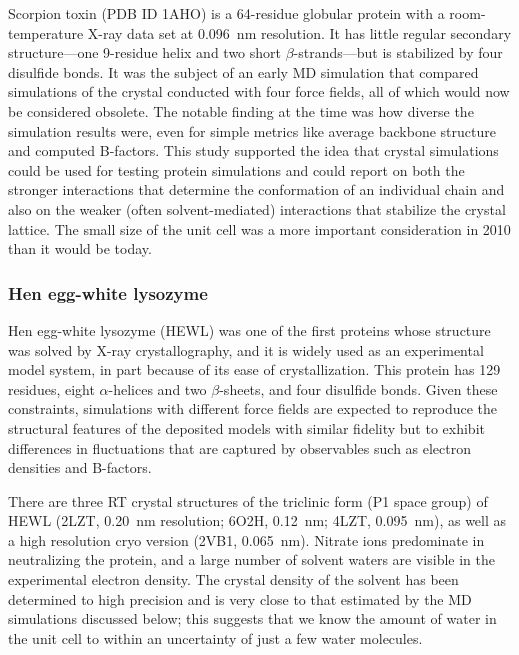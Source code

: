 \documentclass[9pt,review]{livecoms}
\begin{document}
Scorpion toxin (PDB ID 1AHO) is a 64-residue globular protein with a room-temperature X-ray data set at \qty{0.096}{\nano\meter} resolution.
It has little regular secondary structure---one 9-residue helix and two short $\beta$-strands---but is stabilized by four disulfide bonds.
It was the subject of an early MD simulation\cite{cerutti_simulations_2010} that compared simulations of the crystal conducted with four force fields, all of which would now be considered obsolete.
The notable finding at the time was how diverse the simulation results were, even for simple metrics like average backbone structure and computed B-factors.
This study supported the idea that crystal simulations could be used for testing protein simulations and could report on both the stronger interactions that determine the conformation of an individual chain and also on the weaker (often solvent-mediated) interactions that stabilize the crystal lattice.
The small size of the unit cell was a more important consideration in 2010 than it would be today.

\subsubsection{Hen egg-white lysozyme}
\label{sub2:hewl}

Hen egg-white lysozyme (HEWL) was one of the first proteins whose structure was solved by X-ray crystallography, and it is widely used as an experimental model system, in part because of its ease of crystallization.
This protein has 129 residues, eight $\alpha$-helices and two $\beta$-sheets, and four disulfide bonds.
Given these constraints, simulations with different force fields are expected to reproduce the structural features of the deposited models with similar fidelity but to exhibit differences in fluctuations that are captured by observables such as electron densities and B-factors.

There are three RT crystal structures of the triclinic form (P1 space group) of HEWL (2LZT, \qty{0.20}{\nano\meter} resolution; 6O2H, \qty{0.12}{\nano\meter}; 4LZT, \qty{0.095}{\nano\meter}), as well as a high resolution cryo version (2VB1, \qty{0.065}{\nano\meter}).
Nitrate ions predominate in neutralizing the protein, and a large number of solvent waters are visible in the experimental electron density.
The crystal density of the solvent has been determined to high precision \cite{moreau_ice_2020} and is very close to that estimated by the MD simulations discussed below; this suggests that we know the amount of water in the unit cell to within an uncertainty of just a few water molecules. 
\end{document}
